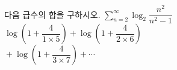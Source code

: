 다음 급수의 합을 구하시오.
 $\displaystyle\sum_{n=2}^{\infty}\log_2\dfrac{n^2}{n^2-1}$
 $\log\left(1+\dfrac{4}{1\times 5}\right)+\log\left(1+\dfrac{4}{2\times 6}\right)$\\ \mbox{}\qquad ${}+\log\left(1+\dfrac{4}{3\times 7}\right)+\cdots$
